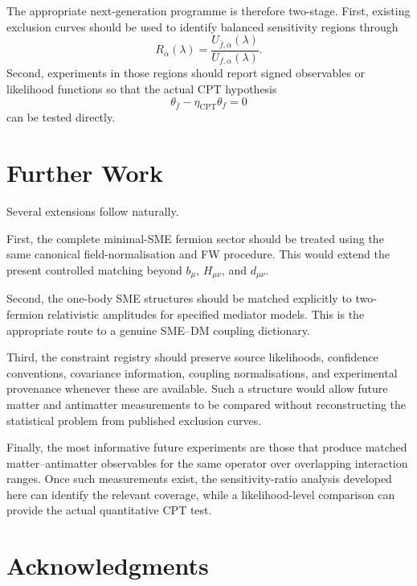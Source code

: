 \documentclass[aps,prd,reprint,superscriptaddress,nofootinbib]{revtex4-2}
\newcommand{\CPT}{\mathrm{CPT}}
\begin{document}
	The appropriate next-generation programme is therefore two-stage.
	First, existing exclusion curves should be used to identify balanced
	sensitivity regions through
	\begin{equation}
		R_\alpha(\lambda)
		=
		\frac{U_{\bar f,\alpha}(\lambda)}
		{U_{f,\alpha}(\lambda)}.
	\end{equation}
	Second, experiments in those regions should report signed observables
	or likelihood functions so that the actual CPT hypothesis
	\begin{equation}
		\theta_{\bar f}-\eta_\CPT\theta_f=0
	\end{equation}
	can be tested directly.
	
	\section{Further Work}
	
	Several extensions follow naturally.
	
	First, the complete minimal-SME fermion sector should be treated using
	the same canonical field-normalisation and FW procedure. This would
	extend the present controlled matching beyond $b_\mu$, $H_{\mu\nu}$,
	and $d_{\mu\nu}$.
	
	Second, the one-body SME structures should be matched explicitly to
	two-fermion relativistic amplitudes for specified mediator models.
	This is the appropriate route to a genuine SME--DM coupling dictionary.
	
	Third, the constraint registry should preserve source likelihoods,
	confidence conventions, covariance information, coupling
	normalisations, and experimental provenance whenever these are
	available. Such a structure would allow future matter and antimatter
	measurements to be compared without reconstructing the statistical
	problem from published exclusion curves.
	
	Finally, the most informative future experiments are those that produce
	matched matter--antimatter observables for the same operator over
	overlapping interaction ranges. Once such measurements exist, the
	sensitivity-ratio analysis developed here can identify the relevant
	coverage, while a likelihood-level comparison can provide the actual
	quantitative CPT test.
	
	\section*{Acknowledgments}
	
\end{document}
